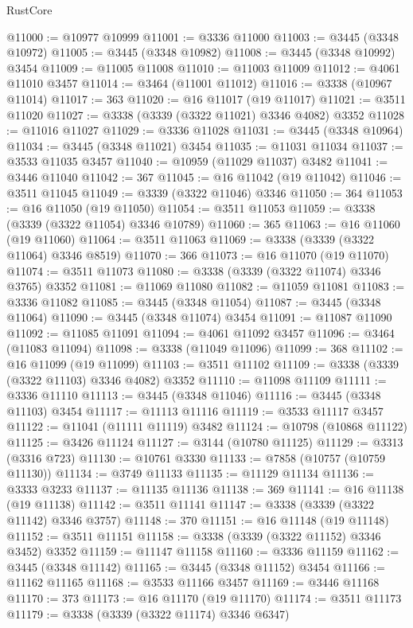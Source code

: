 \begin{lexlean}{RustCore}
\begin{coremodule}
@11000 := @10977 @10999
@11001 := @3336 @11000
@11003 := @3445 (@3348 @10972)
@11005 := @3445 (@3348 @10982)
@11008 := @3445 (@3348 @10992) @3454
@11009 := @11005 @11008
@11010 := @11003 @11009
@11012 := @4061 @11010 @3457
@11014 := @3464 (@11001 @11012)
@11016 := @3338 (@10967 @11014)
@11017 := 363
@11020 := @16 @11017 (@19 @11017)
@11021 := @3511 @11020
@11027 := @3338 (@3339 (@3322 @11021) @3346 @4082) @3352
@11028 := @11016 @11027
@11029 := @3336 @11028
@11031 := @3445 (@3348 @10964)
@11034 := @3445 (@3348 @11021) @3454
@11035 := @11031 @11034
@11037 := @3533 @11035 @3457
@11040 := @10959 (@11029 @11037) @3482
@11041 := @3446 @11040
@11042 := 367
@11045 := @16 @11042 (@19 @11042)
@11046 := @3511 @11045
@11049 := @3339 (@3322 @11046) @3346
@11050 := 364
@11053 := @16 @11050 (@19 @11050)
@11054 := @3511 @11053
@11059 := @3338 (@3339 (@3322 @11054) @3346 @10789)
@11060 := 365
@11063 := @16 @11060 (@19 @11060)
@11064 := @3511 @11063
@11069 := @3338 (@3339 (@3322 @11064) @3346 @8519)
@11070 := 366
@11073 := @16 @11070 (@19 @11070)
@11074 := @3511 @11073
@11080 := @3338 (@3339 (@3322 @11074) @3346 @3765) @3352
@11081 := @11069 @11080
@11082 := @11059 @11081
@11083 := @3336 @11082
@11085 := @3445 (@3348 @11054)
@11087 := @3445 (@3348 @11064)
@11090 := @3445 (@3348 @11074) @3454
@11091 := @11087 @11090
@11092 := @11085 @11091
@11094 := @4061 @11092 @3457
@11096 := @3464 (@11083 @11094)
@11098 := @3338 (@11049 @11096)
@11099 := 368
@11102 := @16 @11099 (@19 @11099)
@11103 := @3511 @11102
@11109 := @3338 (@3339 (@3322 @11103) @3346 @4082) @3352
@11110 := @11098 @11109
@11111 := @3336 @11110
@11113 := @3445 (@3348 @11046)
@11116 := @3445 (@3348 @11103) @3454
@11117 := @11113 @11116
@11119 := @3533 @11117 @3457
@11122 := @11041 (@11111 @11119) @3482
@11124 := @10798 (@10868 @11122)
@11125 := @3426 @11124
@11127 := @3144 (@10780 @11125)
@11129 := @3313 (@3316 @723)
@11130 := @10761 @3330
@11133 := @7858 (@10757 (@10759 @11130))
@11134 := @3749 @11133
@11135 := @11129 @11134
@11136 := @3333 @3233
@11137 := @11135 @11136
@11138 := 369
@11141 := @16 @11138 (@19 @11138)
@11142 := @3511 @11141
@11147 := @3338 (@3339 (@3322 @11142) @3346 @3757)
@11148 := 370
@11151 := @16 @11148 (@19 @11148)
@11152 := @3511 @11151
@11158 := @3338 (@3339 (@3322 @11152) @3346 @3452) @3352
@11159 := @11147 @11158
@11160 := @3336 @11159
@11162 := @3445 (@3348 @11142)
@11165 := @3445 (@3348 @11152) @3454
@11166 := @11162 @11165
@11168 := @3533 @11166 @3457
@11169 := @3446 @11168
@11170 := 373
@11173 := @16 @11170 (@19 @11170)
@11174 := @3511 @11173
@11179 := @3338 (@3339 (@3322 @11174) @3346 @6347)

\end{coremodule}
\end{lexlean}
